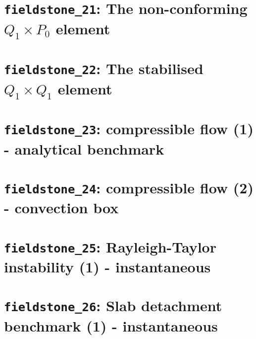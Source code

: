 \documentclass[a4paper]{article}
\begin{document}
\newpage
\section{{\tt fieldstone\_21}: The non-conforming $Q_1 \times P_0$ element \label{f21}}


\newpage
\section{{\tt fieldstone\_22}: The stabilised $Q_1 \times Q_1$ element \label{f22}} 


\newpage
\section{{\tt fieldstone\_23}: compressible flow (1) - analytical benchmark \label{f23}}


\newpage
\section{{\tt fieldstone\_24}: compressible flow (2) - convection box \label{f24}}


\newpage %
\section{{\tt fieldstone\_25}: Rayleigh-Taylor instability (1) - instantaneous \label{f25}}

\newpage %
\section{{\tt fieldstone\_26}: Slab detachment benchmark (1) - instantaneous \label{f26}}
\end{document}
